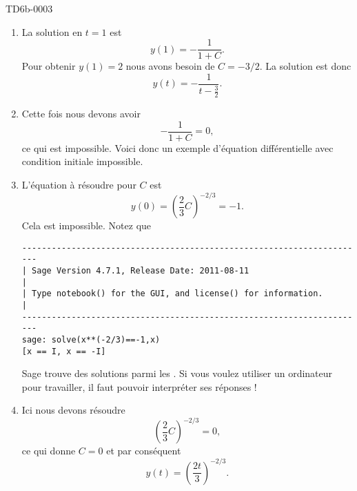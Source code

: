 \begin{corrige}{TD6b-0003}
\begin{enumerate}
    \item
        
        La solution en \( t=1\) est
        \begin{equation}
            y(1)=-\frac{ 1 }{ 1+C }.
        \end{equation}
        Pour obtenir \( y(1)=2\) nous avons besoin de \( C=-3/2\). La solution est donc
        \begin{equation}
            y(t)=-\frac{1}{ t-\frac{ 3 }{ 2 } }.
        \end{equation}
        
    \item

        Cette fois nous devons avoir
        \begin{equation}
            -\frac{1}{ 1+C }=0,
        \end{equation}
        ce qui est impossible. Voici donc un exemple d'équation différentielle avec condition initiale impossible.

    \item

        L'équation à résoudre pour \( C\) est
        \begin{equation}
            y(0)=\left( \frac{ 2 }{ 3 }C \right)^{-2/3}=-1.
        \end{equation}
        Cela est impossible. Notez que
        \begin{verbatim}
----------------------------------------------------------------------
| Sage Version 4.7.1, Release Date: 2011-08-11                       |
| Type notebook() for the GUI, and license() for information.        |
----------------------------------------------------------------------
sage: solve(x**(-2/3)==-1,x)
[x == I, x == -I]
        \end{verbatim}

        Sage trouve des solutions parmi les . Si vous voulez utiliser un ordinateur pour travailler, il faut pouvoir interpréter ses réponses !

    \item

        Ici nous devons résoudre
        \begin{equation}
            \left( \frac{ 2 }{ 3 }C \right)^{-2/3}=0,
        \end{equation}
        ce qui donne \( C=0\) et par conséquent
        \begin{equation}
            y(t)=\left( \frac{ 2t }{ 3 } \right)^{-2/3}.
        \end{equation}

    \end{enumerate}
\end{corrige}
